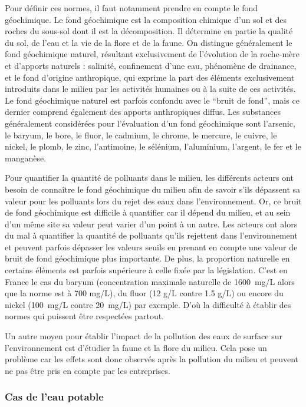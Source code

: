 \documentclass{article}
\begin{document}
Pour définir ces normes, il faut notamment prendre en compte le fond géochimique. Le fond géochimique est la composition chimique d'un sol et des roches du sous-sol dont il est la décomposition. Il détermine en partie la qualité du sol, de l'eau et la vie de la flore et de la faune. On distingue généralement le fond géochimique naturel, résultant exclusivement de l'évolution de la roche-mère et d'apports naturels : salinité, confinement d’une eau, phénomène de drainance, et le fond d'origine anthropique, qui exprime la part des éléments exclusivement introduits dans le milieu par les activités humaines ou à la suite de ces activités. Le fond géochimique naturel est parfois confondu avec le  “bruit de fond”, mais ce dernier comprend également des apports anthropiques diffus. Les substances généralement considérées pour l’évaluation d’un fond géochimique sont  l’arsenic, le baryum, le bore, le fluor, le cadmium, le chrome, le mercure, le cuivre, le nickel, le plomb, le zinc, l’antimoine, le sélénium, l’aluminium, l’argent, le fer et le manganèse.

Pour quantifier la quantité de polluants dans le milieu, les différents acteurs ont besoin de connaître le fond géochimique du milieu afin de savoir s’ils dépassent sa valeur pour les polluants lors du rejet des eaux dans l’environnement. Or, ce bruit de fond géochimique est difficile à quantifier car il dépend du milieu, et au sein d’un même site sa valeur peut varier d’un point à un autre. Les acteurs ont alors du mal à quantifier la quantité de polluants qu’ils rejettent dans l’environnement et peuvent parfois dépasser les valeurs seuils en prenant en compte une valeur de bruit de fond géochimique plus importante. De plus, la proportion naturelle en certains éléments est parfois supérieure à celle fixée par la législation. C’est en France le cas du baryum (concentration maximale naturelle de 1600~mg/L alors que la norme est à 700 mg/L), du fluor (12 g/L contre 1.5 g/L) ou encore du nickel (100~mg/L contre 20~mg/L) par exemple. D’où la difficulté à établir des normes qui puissent être respectées partout. %

Un autre moyen pour établir l’impact de la pollution des eaux de surface sur l’environnement est d’étudier la faune et la flore du milieu. Cela pose un problème car les effets sont donc observés après la pollution du milieu et peuvent ne pas être pris en compte par les entreprises. 

\subsubsection{Cas de l’eau potable} 
\end{document}
